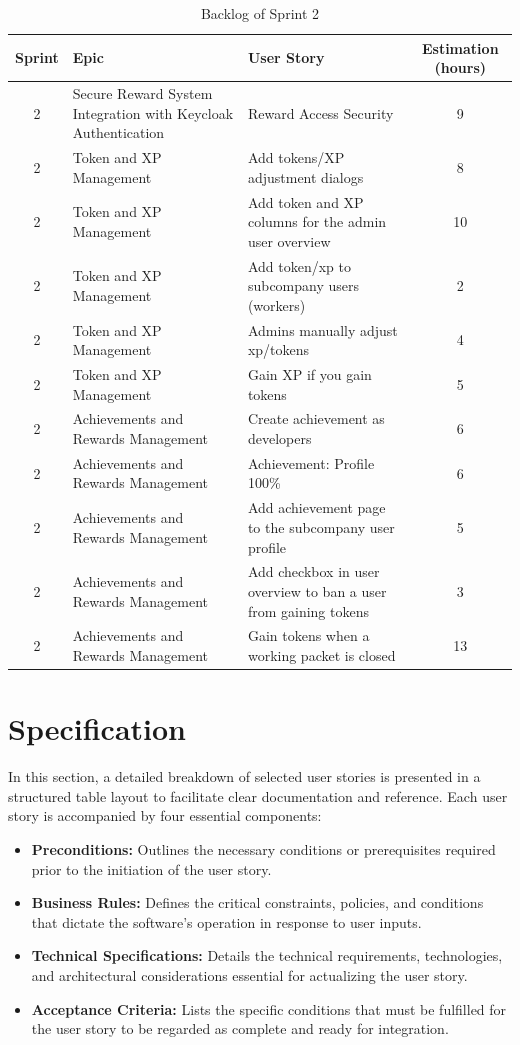\begin{table}[H]
\centering
\caption{Backlog of Sprint 2}
\label{tab:backlog_sprint_2}
\begin{tabular}{|c|p{4cm}|p{6cm}|c|}
\hline
\textbf{Sprint} & \textbf{Epic} & \textbf{User Story} & \textbf{Estimation (hours)} \\ \hline
2 & Secure Reward System Integration with Keycloak Authentication & Reward Access Security & 9 \\ \hline
2 & Token and XP Management & Add tokens/XP adjustment dialogs & 8 \\ \hline
2 & Token and XP Management & Add token and XP columns for the admin user overview & 10 \\ \hline
2 & Token and XP Management & Add token/xp to subcompany users (workers) & 2 \\ \hline
2 & Token and XP Management & Admins manually adjust xp/tokens & 4 \\ \hline
2 & Token and XP Management & Gain XP if you gain tokens & 5 \\ \hline
2 & Achievements and Rewards Management & Create achievement as developers & 6 \\ \hline
2 & Achievements and Rewards Management & Achievement: Profile 100\% & 6 \\ \hline
2 & Achievements and Rewards Management & Add achievement page to the subcompany user profile & 5 \\ \hline
2 & Achievements and Rewards Management & Add checkbox in user overview to ban a user from gaining tokens & 3 \\ \hline
2 & Achievements and Rewards Management & Gain tokens when a working packet is closed & 13 \\ \hline
\end{tabular}
\end{table}


\section{Specification}

In this section, a detailed breakdown of selected user stories is presented in a structured table layout to facilitate clear documentation and reference. Each user story is accompanied by four essential components:
\begin{itemize}
    \item \textbf{Preconditions:} Outlines the necessary conditions or prerequisites required prior to the initiation of the user story.
    \item \textbf{Business Rules:} Defines the critical constraints, policies, and conditions that dictate the software's operation in response to user inputs.
    \item \textbf{Technical Specifications:} Details the technical requirements, technologies, and architectural considerations essential for actualizing the user story.
    \item \textbf{Acceptance Criteria:} Lists the specific conditions that must be fulfilled for the user story to be regarded as complete and ready for integration.
\end{itemize}

